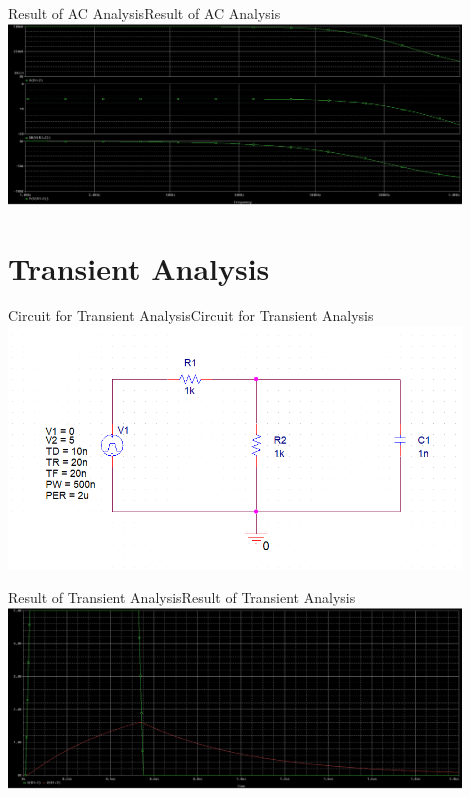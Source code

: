 \documentclass[12pt]{../manual}
\begin{document}
\begin{myfigure}[label=fig:acAnalRes]{Result of AC Analysis}{Result of AC Analysis}
\includegraphics[width=0.9\textwidth]{figures/ResultACAnalysisCrop.PNG}
\end{myfigure}

\newpage
\section{Transient Analysis}
\begin{myfigure}[colback=white,label=fig:trans]{Circuit for Transient Analysis}{Circuit for Transient Analysis}
\includegraphics[width=0.9\textwidth]{figures/TransientAnalysisCircuitCrop.PNG}
\end{myfigure}

\begin{myfigure}[label=fig:transAnalRes]{Result of Transient Analysis}{Result of Transient Analysis}
\includegraphics[width=0.9\textwidth]{figures/ResultTransientAnalysisCrop.PNG}
\end{myfigure}
\end{document}
